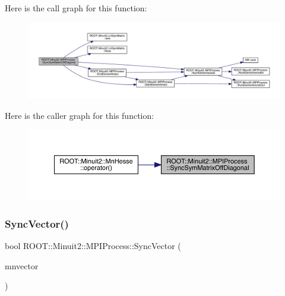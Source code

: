 Here is the call graph for this function\+:
\nopagebreak
\begin{figure}[H]
\begin{center}
\leavevmode
\includegraphics[width=350pt]{dc/d43/classROOT_1_1Minuit2_1_1MPIProcess_ac00f83396ec6b7985dad640981a07657_cgraph}
\end{center}
\end{figure}
Here is the caller graph for this function\+:
\nopagebreak
\begin{figure}[H]
\begin{center}
\leavevmode
\includegraphics[width=350pt]{dc/d43/classROOT_1_1Minuit2_1_1MPIProcess_ac00f83396ec6b7985dad640981a07657_icgraph}
\end{center}
\end{figure}
\mbox{\label{classROOT_1_1Minuit2_1_1MPIProcess_a179f3ea817399a73cbce05d1778ec128}} 
\subsubsection{\texorpdfstring{SyncVector()}{SyncVector()}\hspace{0.1cm}{\footnotesize\ttfamily [1/3]}}
{\footnotesize\ttfamily bool R\+O\+O\+T\+::\+Minuit2\+::\+M\+P\+I\+Process\+::\+Sync\+Vector (\begin{DoxyParamCaption}\item[{\mbox{\hyperlink{namespaceROOT_1_1Minuit2_a62ed97730a1ca8d3fbaec64a19aa11c9}{R\+O\+O\+T\+::\+Minuit2\+::\+Mn\+Algebraic\+Vector}} \&}]{mnvector }\end{DoxyParamCaption})}


